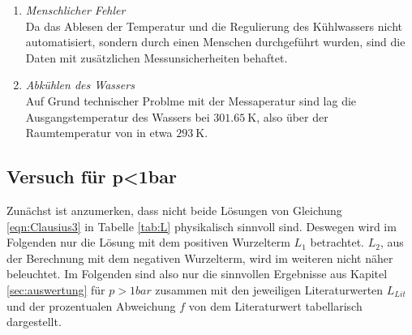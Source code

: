 \begin{enumerate}
  \item \textit{Menschlicher Fehler}\\
    Da das Ablesen der Temperatur und die Regulierung des Kühlwassers nicht automatisiert, sondern durch
    einen Menschen durchgeführt wurden, sind die Daten mit zusätzlichen Messunsicherheiten behaftet.
  \item \textit{Abkühlen des Wassers}\\
    Auf Grund technischer Problme mit der Messaperatur sind lag die Ausgangstemperatur des Wassers
    bei $\SI{301.65}{\kelvin}$, also über der Raumtemperatur von in etwa $\SI{293}{\kelvin}$.
\end{enumerate}

\subsection{Versuch für p<1bar}
Zunächst ist anzumerken, dass nicht beide Lösungen von Gleichung \ref{eqn:Clausius3} in Tabelle \ref{tab:L}
physikalisch sinnvoll sind. Deswegen wird im Folgenden nur die Lösung mit dem positiven Wurzelterm $L_1$
betrachtet. $L_2$, aus der Berechnung mit dem negativen Wurzelterm, wird im weiteren nicht näher beleuchtet.
Im Folgenden sind also nur die sinnvollen Ergebnisse aus Kapitel \ref{sec:auswertung} für $p>1bar$ zusammen 
mit den jeweiligen Literaturwerten $L_{Lit}$ und der prozentualen Abweichung $f$ von dem Literaturwert 
tabellarisch dargestellt.
